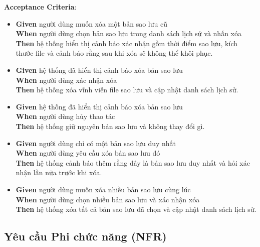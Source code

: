 \textbf{Acceptance Criteria}:

\begin{itemize}
\item \textbf{Given} người dùng muốn xóa một bản sao lưu cũ  \\ \hspace*{1.5em}  \textbf{When} người dùng chọn bản sao lưu trong danh sách lịch sử và nhấn xóa  \\ \hspace*{1.5em}  \textbf{Then} hệ thống hiển thị cảnh báo xác nhận gồm thời điểm sao lưu, kích thước file và cảnh báo rằng sau khi xóa sẽ không thể khôi phục.
\item \textbf{Given} hệ thống đã hiển thị cảnh báo xóa bản sao lưu  \\ \hspace*{1.5em}  \textbf{When} người dùng xác nhận xóa  \\ \hspace*{1.5em}  \textbf{Then} hệ thống xóa vĩnh viễn file sao lưu và cập nhật danh sách lịch sử.
\item \textbf{Given} hệ thống đã hiển thị cảnh báo xóa bản sao lưu  \\ \hspace*{1.5em}  \textbf{When} người dùng hủy thao tác  \\ \hspace*{1.5em}  \textbf{Then} hệ thống giữ nguyên bản sao lưu và không thay đổi gì.
\item \textbf{Given} người dùng chỉ có một bản sao lưu duy nhất  \\ \hspace*{1.5em}  \textbf{When} người dùng yêu cầu xóa bản sao lưu đó  \\ \hspace*{1.5em}  \textbf{Then} hệ thống cảnh báo thêm rằng đây là bản sao lưu duy nhất và hỏi xác nhận lần nữa trước khi xóa.
\item \textbf{Given} người dùng muốn xóa nhiều bản sao lưu cùng lúc  \\ \hspace*{1.5em}  \textbf{When} người dùng chọn nhiều bản sao lưu và xác nhận xóa  \\ \hspace*{1.5em}  \textbf{Then} hệ thống xóa tất cả bản sao lưu đã chọn và cập nhật danh sách lịch sử.
\end{itemize}
\subsection{Yêu cầu Phi chức năng (NFR)}

